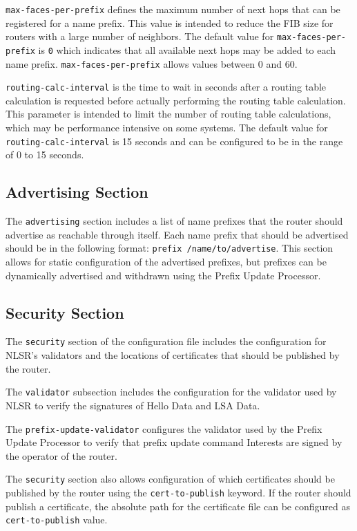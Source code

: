 \texttt{max-faces-per-prefix} defines the maximum number of next hops that can be registered for a name prefix.
This value is intended to reduce the FIB size for routers with a large number of neighbors.
The default value for \texttt{max-faces-per-prefix} is \texttt{0} which indicates that all available next hops may be added to each name prefix. \texttt{max-faces-per-prefix} allows values between 0 and 60.

\texttt{routing-calc-interval} is the time to wait in seconds after a routing table calculation is requested before actually performing the routing table calculation.
This parameter is intended to limit the number of routing table calculations, which may be performance intensive on some systems.
The default value for \texttt{routing-calc-interval} is 15 seconds and can be configured to be in the range of 0 to 15 seconds.

\subsection{Advertising Section}

The \texttt{advertising} section includes a list of name prefixes that the router should advertise as reachable through itself.
Each name prefix that should be advertised should be in the following format: \texttt{prefix /name/to/advertise}.
This section allows for static configuration of the advertised prefixes, but prefixes can be dynamically advertised and withdrawn using the Prefix Update Processor.

\subsection{Security Section}

The \texttt{security} section of the configuration file includes the configuration for NLSR's validators and the locations of certificates that should be published by the router.

The \texttt{validator} subsection includes the configuration for the validator used by NLSR to verify the signatures of Hello Data and LSA Data.

The \texttt{prefix-update-validator} configures the validator used by the Prefix Update Processor to verify that prefix update command Interests are signed by the operator of the router.

The \texttt{security} section also allows configuration of which certificates should be published by the router using the \texttt{cert-to-publish} keyword.
If the router should publish a certificate, the absolute path for the certificate file can be configured as \texttt{cert-to-publish} value.
